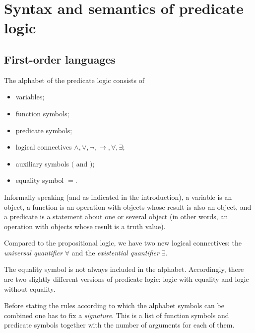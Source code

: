 \begin{page}
\setcounter{section}{1}
\setcounter{subsection}{1}
\setcounter{dfn}{0}
\label{portion:484}

\section{Syntax and semantics of predicate logic}

\end{page}

\begin{page}
\setcounter{section}{1}
\setcounter{subsection}{1}
\setcounter{dfn}{0}
\label{portion:485}

\subsection{First-order languages}
The alphabet of the predicate logic consists of
\begin{itemize}
\item
variables;
\item
function symbols;
\item
predicate symbols;
\item
logical connectives $\wedge, \vee, \neg, \to, \forall, \exists$;
\item
auxiliary symbols $($ and $)$;
\item
equality symbol $=$.
\end{itemize}

Informally speaking (and as indicated in the introduction), a variable is an object,
a function is an operation with objects whose result is also an object,
and a predicate is a statement about one or several object (in other words, an operation with objects whose result is a truth value).

Compared to the propositional logic, we have two new logical connectives:
the \emph{universal quantifier} $\forall$ and the \emph{existential quantifier} $\exists$.

The equality symbol is not always included in the alphabet.
Accordingly, there are two slightly different versions of predicate logic: logic with equality and logic without equality.

Before stating the rules according to which the alphabet symbols can be combined one has to fix a \emph{signature}.
This is a list of function symbols and predicate symbols together with the number of arguments for each of them.


\end{page}

